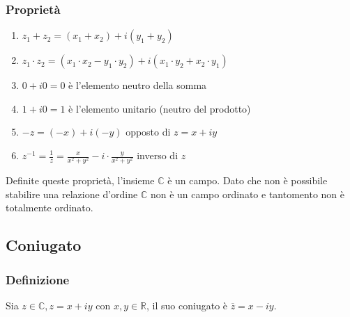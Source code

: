 \documentclass[a4paper]{article}
\begin{document}
\subsubsection*{Proprietà}
\begin{enumerate}
	\item \(z_1 + z_2 = (x_1 + x_2) + i (y_1 + y_2)\)
	\item \(z_1 \cdot z_2 = (x_1 \cdot x_2 - y_1 \cdot y_2) + i (x_1 \cdot y_2 + x_2 \cdot y_1)\)
	\item \(0 + i0 = 0 \) è l'elemento neutro della somma
	\item \(1 + i0 = 1 \) è l'elemento unitario (neutro del prodotto)
	\item \(-z = (-x) + i(-y)\) opposto di \(z = x + iy\)
	\item \(\displaystyle z^{-1} = \frac{1}{z} = \frac{x}{x^2 + y^2} - i \cdot \frac{y}{x^2 + y^2}\) inverso di \(z\)
\end{enumerate}
Definite queste proprietà, l'insieme \(\mathbb{C}\) è un campo. Dato che non è possibile stabilire una relazione d'ordine \(\mathbb{C}\)
non è un campo ordinato e tantomento non è totalmente ordinato.


\subsection{Coniugato}
\subsubsection*{Definizione}
Sia \(z \in \mathbb{C}, z = x + i y\) con \(x,y \in \mathbb{R}\), il suo coniugato è \(\overline{z} = x - iy\).
\end{document}
